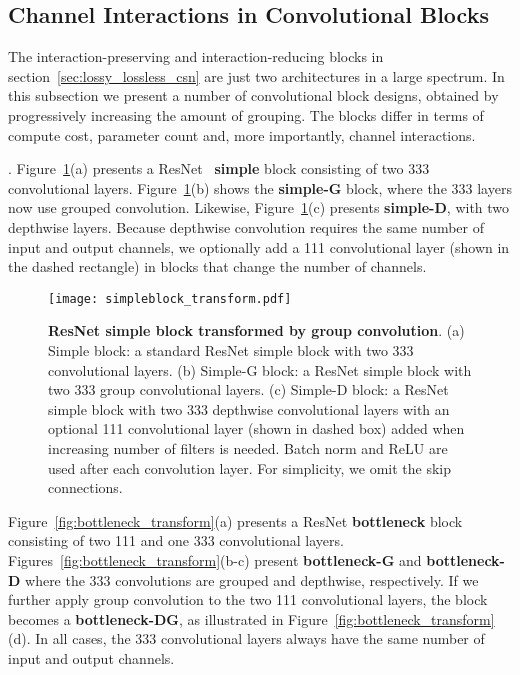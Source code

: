 \documentclass[10pt,twocolumn,letterpaper]{article}
\newcommand{\ddd}[1]{#1#1#1}
\begin{document}
\subsection{Channel Interactions in Convolutional Blocks}
\label{sec:group_conv_by_blocks}

The interaction-preserving and interaction-reducing blocks in section~\ref{sec:lossy_lossless_csn} are just two architectures in a large spectrum. In this subsection we present a number of convolutional block designs, obtained by progressively increasing the amount of grouping. The blocks differ in terms of compute cost, parameter count and, more importantly, channel interactions. 

 
. Figure~\ref{fig:simpleblock_transform}(a) presents a ResNet~\cite{KaimingHe16}  {\bf simple} block consisting of two \ddd{3} convolutional layers. Figure~\ref{fig:simpleblock_transform}(b) shows the {\bf simple-G} block, where the \ddd{3} layers now use grouped convolution.  Likewise, Figure~\ref{fig:simpleblock_transform}(c) presents {\bf simple-D}, with two depthwise layers.  Because depthwise convolution requires the same number of input and output channels, we optionally add a \ddd{1} convolutional layer (shown in the dashed rectangle) in blocks that change the number of channels. 

\begin{figure}
\begin{center}
   \texttt{[image: simpleblock\_transform.pdf]}
\end{center}
\vspace{-10pt}
   \caption{{\bf ResNet simple block transformed by group convolution}. (a) Simple block: a standard ResNet simple block with two \ddd{3} convolutional layers. (b) Simple-G block: a ResNet simple block with two \ddd{3} group convolutional layers. (c) Simple-D block: a ResNet simple block with two \ddd{3} depthwise convolutional layers with an optional \ddd{1} convolutional layer (shown in dashed box) added when increasing number of filters is needed. Batch norm and ReLU are used after each convolution layer. For simplicity, we omit the skip connections.}
\label{fig:simpleblock_transform}
\end{figure}


Figure~\ref{fig:bottleneck_transform}(a) presents a ResNet {\bf bottleneck} block consisting of two \ddd{1} and one \ddd{3} convolutional layers. Figures~\ref{fig:bottleneck_transform}(b-c) present {\bf bottleneck-G} and  {\bf bottleneck-D} where the \ddd{3} convolutions are grouped and depthwise, respectively. If we further apply group convolution to the two \ddd{1} convolutional layers, the block becomes a {\bf bottleneck-DG}, as illustrated in Figure~\ref{fig:bottleneck_transform}(d). In all cases, the \ddd{3} convolutional layers always have the same number of input and output channels. 
\end{document}
